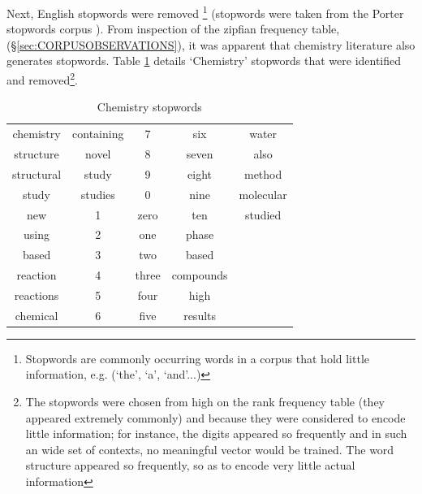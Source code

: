 Next, English stopwords were removed \footnote{Stopwords are commonly occurring words in a corpus that hold little information, e.g. (`the', `a', `and'...)} (stopwords were taken from the Porter stopwords corpus\cite{nltk} \cite{porter}). From inspection of the zipfian frequency table, (\S \ref{sec:CORPUSOBSERVATIONS}), it was apparent that chemistry literature also generates stopwords. Table \ref{tab:CHEMSTOP} details `Chemistry' stopwords that were identified and removed\footnote{The stopwords were chosen from high on the rank frequency table (they appeared extremely commonly) and because they were considered to encode little information; for instance, the digits appeared so frequently and in such an wide set of contexts, no meaningful vector would be trained. The word structure appeared so frequently, so as to encode very little actual information}. 
\begin{table}[h!]
\begin{center}
\caption{Chemistry stopwords}
\label{tab:CHEMSTOP}
\begin{tabular}{||c|c|c|c|c||}
\hline
chemistry & containing & 7 & six & water\\
structure & novel & 8 & seven & also\\
structural & study & 9 & eight & method\\
study & studies & 0 & nine & molecular\\
new & 1 & zero & ten & studied\\
using & 2 & one & phase& \\
based & 3 & two & based& \\
reaction & 4 & three & compounds & \\
reactions & 5 & four & high & \\
chemical & 6 & five & results & \\
\hline

\end{tabular}
\end{center}
\end{table}

